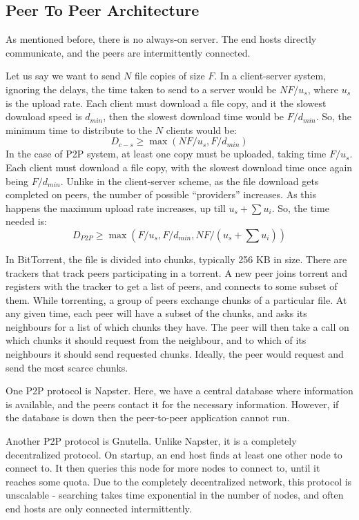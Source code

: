 \documentclass[12pt,letterpaper]{article}
\theoremstyle{definition}
\begin{document}
\subsection{Peer To Peer Architecture}

As mentioned before, there is no always-on server. The end hosts directly communicate, and the peers are intermittently connected.

Let us say we want to send $N$ file copies of size $F$. In a client-server system, ignoring the delays, the time taken to send to a server would be $NF/u_s$, where $u_s$ is the upload rate. Each client must download a file copy, and it the slowest download speed is $d_{min}$, then the slowest download time would be $F/d_{min}$. So, the minimum time to distribute to the $N$ clients would be:
\[D_{c-s} \geq \max(NF/u_s,F/d_{min})\]
In the case of P2P system, at least one copy must be uploaded, taking time $F/u_s$. Each client must download a file copy, with the slowest download time once again being $F/d_{min}$. Unlike in the client-server scheme, as the file download gets completed on peers, the number of possible ``providers'' increases. As this happens the maximum upload rate increases, up till $u_s +\sum u_i$. So, the time needed is:
\[D_{P2P} \geq \max(F/u_s,F/d_{min},NF/(u_s+ \sum u_i))\]

In BitTorrent, the file is divided into chunks, typically 256 KB in size. There are trackers that track peers participating in a torrent. A new peer joins torrent and registers with the tracker to get a list of peers, and connects to some subset of them. While torrenting, a group of peers exchange chunks of a particular file. At any given time, each peer will have a subset of the chunks, and asks its neighbours for a list of which chunks they have. The peer will then take a call on which chunks it should request from the neighbour, and to which of its neighbours it should send requested chunks. Ideally, the peer would request and send the most scarce chunks.

One P2P protocol is Napster. Here, we have a central database where information is available, and the peers contact it for the necessary information. However, if the database is down then the peer-to-peer application cannot run.

Another P2P protocol is Gnutella. Unlike Napster, it is a completely decentralized protocol. On startup, an end host finds at least one other node to connect to. It then queries this node for more nodes to connect to, until it reaches some quota. Due to the completely decentralized network, this protocol is unscalable - searching takes time exponential in the number of nodes, and often end hosts are only connected intermittently.
\end{document}
